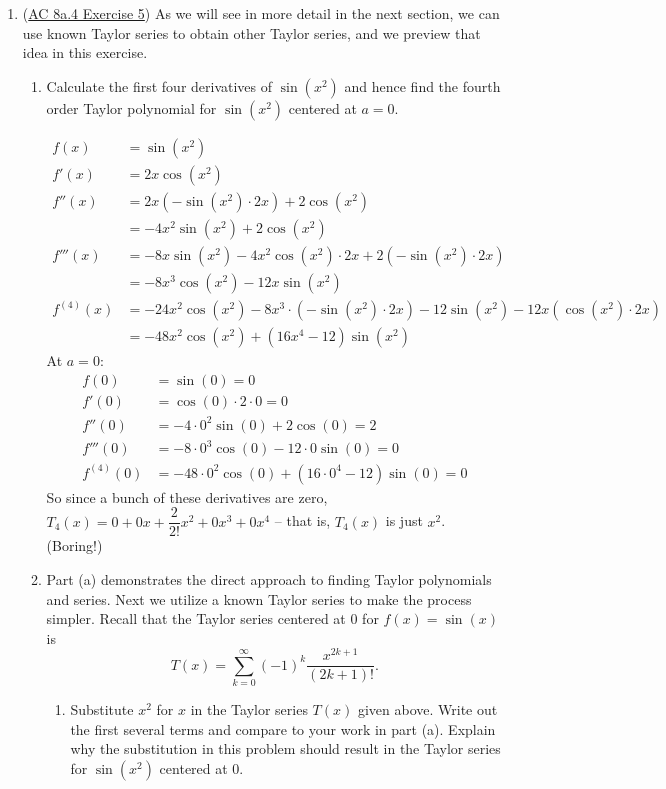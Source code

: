 \begin{enumerate}[leftmargin=0pt]
\item (\href{https://faculty.gvsu.edu/boelkinm/Home/ACS/sec-8a-4-taylor-series.html#exercise-367}{AC 8a.4 Exercise 5}) As we will see in more detail in the next section, we can use known Taylor series to obtain other Taylor series, and we preview that idea in this exercise.

\begin{enumerate}
    \item Calculate the first four derivatives of $\sin(x^2)$ and hence find the fourth order Taylor polynomial for $\sin(x^2)$ centered at $a=0$.
    
    \begin{red}
    \begin{align*}
        f(x) &= \sin(x^2)\\
        f'(x) &= 2x \cos(x^2) \\
        f''(x) &= 2x(-\sin(x^2)\cdot 2x) + 2 \cos(x^2)  \\
        &= -4x^2 \sin(x^2) + 2\cos(x^2) \\
        f'''(x) &= -8x\sin(x^2) - 4x^2\cos(x^2)\cdot 2x + 2(-\sin(x^2)\cdot 2x) \\
        &= -8x^3 \cos(x^2) - 12x\sin(x^2) \\
        f^{(4)}(x) &= -24x^2\cos(x^2) -8x^3\cdot(-\sin(x^2)\cdot 2x)
        - 12 \sin(x^2) - 12x(\cos(x^2)\cdot 2x) \\
        &= -48x^2\cos(x^2)+(16x^4 - 12)\sin(x^2)
    \end{align*}
    At $a=0$:
    \begin{align*}
        f(0) &= \sin(0) = 0 \\
        f'(0) &= \cos(0) \cdot 2\cdot 0 = 0 \\
        f''(0) &= -4\cdot 0^2 \sin(0) + 2 \cos(0) = 2  \\
        f'''(0) &= -8\cdot 0^3\cos(0) - 12\cdot 0 \sin(0) = 0 \\
        f^{(4)}(0) &= -48\cdot 0^2 \cos(0) + (16\cdot 0^4 - 12)\sin(0) = 0
    \end{align*}
    So since a bunch of these derivatives are zero, $T_4(x) = 0 + 0x + \dfrac{2}{2!}x^2 + 0x^3 + 0x^4 $ -- that is, $T_4(x)$ is just $x^2$. (Boring!)
    \end{red}
    \item Part (a) demonstrates the direct approach to finding Taylor polynomials and series. Next we utilize a known Taylor series to make the process simpler. Recall that the Taylor series centered at 0 for $f(x) = \sin(x)$ is
    \begin{equation}
    T(x) = \sum_{k=0}^{\infty} (-1)^{k} \frac{x^{2k+1}}{(2k+1)!}\text{.}
    \end{equation}
    \begin{enumerate}
        \item[i.] Substitute $x^2$ for $x$ in the Taylor series $T(x)$ given above. Write out the first several terms and compare to your work in part (a). Explain why the substitution in this problem should result in the Taylor series for $\sin(x^2)$ centered at 0.


\end{enumerate}
\end{enumerate}
\end{enumerate}
